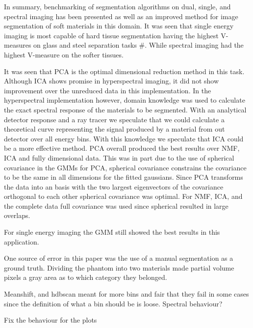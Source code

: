 \documentclass[a4paper,11pt]{article}
\begin{document}
In summary, benchmarking of segmentation algorithms on dual, single, and spectral imaging has been presented as well as an improved method for image segmentation of soft materials in this domain. It was seen that single energy imaging is most capable of hard tissue segmentation having the highest V-measures on glass and steel separation tasks \#. While spectral imaging had the highest V-measure on the softer tissues.

It was seen that PCA is the optimal dimensional reduction method in this task. Although ICA shows promise in hyperspectral imaging, it did not show improvement over the unreduced data in this implementation. In the hyperspectral implementation however, domain knowledge was used to calculate the exact spectral response of the materials to be segmented. With an analytical detector response and a ray tracer we speculate that we could calculate a theoretical curve representing the signal produced by a material from out detector over all energy bins. With this knowledge we speculate that ICA could be a more effective method. PCA overall produced the best results over NMF, ICA and fully dimensional data. This was in part due to the use of spherical covariance in the GMMs for PCA, spherical covariance constrains the covariance to be the same in all dimensions for the fitted gaussians. Since PCA transforms the data into an basis with the two largest eigenvectors of the covariance orthogonal to each other spherical covariance was optimal. For NMF, ICA, and the complete data full covariance was used since spherical resulted in large overlaps.

For single energy imaging the GMM still showed the best results in this application.

One source of error in this paper was the use of a manual segmentation as a ground truth. Dividing the phantom into two materials made partial volume pixels a gray area as to which category they belonged. 

Meanshift, and hdbscan meant for more bins and fair that they fail in some cases since the definition of what a bin should be is loose. Spectral behaviour?

Fix the behaviour for the plots



\end{document}

